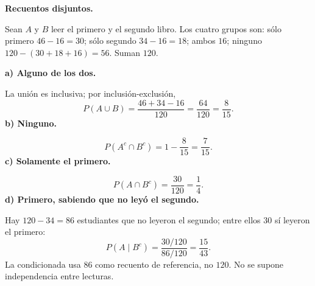 \textbf{Recuentos disjuntos.}\par\nopagebreak[4]
Sean $A$ y $B$ leer el primero y el segundo libro. Los cuatro grupos son: sólo primero $46-16=30$; sólo segundo $34-16=18$; ambos $16$; ninguno $120-(30+18+16)=56$. Suman $120$.

\textbf{a) Alguno de los dos.}\par\nopagebreak[4]
La unión es inclusiva; por inclusión-exclusión,
\[
\boxed{P(A\cup B)=\frac{46+34-16}{120}=\frac{64}{120}=\frac8{15}.}
\]
\textbf{b) Ninguno.}\par\nopagebreak[4]
\[
\boxed{P(A^c\cap B^c)=1-\frac8{15}=\frac7{15}.}
\]
\textbf{c) Solamente el primero.}\par\nopagebreak[4]
\[
\boxed{P(A\cap B^c)=\frac{30}{120}=\frac14.}
\]
\textbf{d) Primero, sabiendo que no leyó el segundo.}\par\nopagebreak[4]
Hay $120-34=86$ estudiantes que no leyeron el segundo; entre ellos $30$ sí leyeron el primero:
\[
\boxed{P(A\mid B^c)=\frac{30/120}{86/120}=\frac{15}{43}.}
\]
La condicionada usa $86$ como recuento de referencia, no $120$. No se supone independencia entre lecturas.
